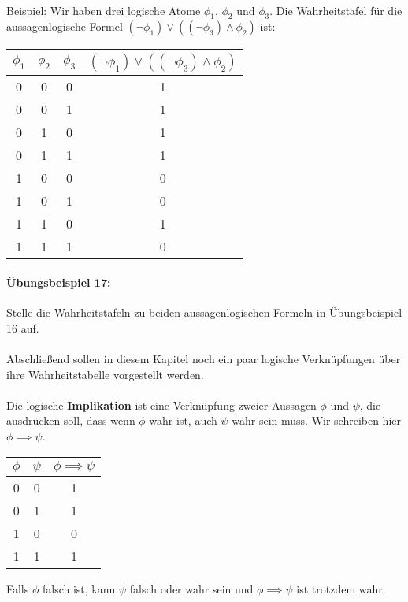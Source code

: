 \documentclass[11pt,a4paper,leqno]{report}
\numberwithin{equation}{chapter}
\begin{document}
\\
Beispiel: Wir haben drei logische Atome $\phi_1$, $\phi_2$ und $\phi_3$. Die Wahrheitstafel für die aussagenlogische Formel $(\neg\phi_1)\vee((\neg\phi_3)\wedge\phi_2)$ ist:
\begin{center}
	\begin{tabular}{|c c c|c|}
	$\phi_1$ & $\phi_2$ & $\phi_3$ & $(\neg\phi_1)\vee((\neg\phi_3)\wedge\phi_2)$\\
	\hline
	0 & 0 & 0 & 1\\
	0 & 0 & 1 & 1\\
	0 & 1 & 0 & 1\\
	0 & 1 & 1 & 1\\
	1 & 0 & 0 & 0\\
	1 & 0 & 1 & 0\\
	1 & 1 & 0 & 1\\
	1 & 1 & 1 & 0\\
\end{tabular}  
\end{center}
\paragraph{Übungsbeispiel 17:} Stelle die Wahrheitstafeln zu beiden aussagenlogischen Formeln in Übungsbeispiel 16 auf.\\
\\
Abschließend sollen in diesem Kapitel noch ein paar logische Verknüpfungen über ihre Wahrheitstabelle vorgestellt werden.\\
\\
Die logische \textbf{Implikation} ist eine Verknüpfung zweier Aussagen $\phi$ und $\psi$, die ausdrücken soll, dass wenn $\phi$ wahr ist, auch $\psi$ wahr sein muss. Wir schreiben hier $\phi \implies \psi$.\\
\begin{center}
\begin{tabular}{|c c|c|}
	$\phi$ & $\psi$ & $\phi \implies \psi$\\
	\hline
	0 & 0 & 1\\
	0 & 1 & 1\\
	1 & 0 & 0\\
	1 & 1 & 1\\
\end{tabular}  
\end{center}
Falls $\phi$ falsch ist, kann $\psi$ falsch oder wahr sein und $\phi\implies\psi$ ist trotzdem wahr.
\end{document}
